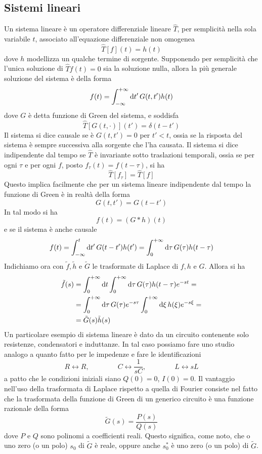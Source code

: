 \documentclass[a4paper, 11pt]{article}
\begin{document}
	\subsection{Sistemi lineari}
	Un sistema lineare è un operatore differenziale lineare $\hat{T}$, per semplicità nella sola variabile $t$, associato all'equazione differenziale non omogenea
	\[\hat{T}[f](t)=h(t)\]
	dove $h$ modellizza un qualche termine di sorgente. Supponendo per semplicità che l'unica soluzione di $\hat{T}f(t)=0$ sia la soluzione nulla, allora la più generale soluzione del sistema è della forma
	\[f(t)=\int_{-\infty}^{+\infty}\mathrm{d} t'\, G(t,t')h(t)\]
	dove $G$ è detta funzione di Green del sistema, e soddisfa
	\[\hat T[G(t,\cdot)](t')=\delta(t-t')\]
	Il sistema si dice causale se è $G(t,t')=0$ per $t'<t$, ossia se la risposta del sistema è sempre successiva alla sorgente che l'ha causata. Il sistema si dice indipendente dal tempo se $\hat T$ è invariante sotto traslazioni temporali, ossia se per ogni $\tau$ e per ogni $f$, posto $f_\tau(t)=f(t-\tau)$, si ha
	\[\hat T[f_\tau]=\hat T[f]\]
	Questo implica facilmente che per un sistema lineare indipendente dal tempo la funzione di Green è in realtà della forma
	\[G(t,t')=G(t-t')\]
	In tal modo si ha
	\[f(t)=(G*h)(t)\]
	e se il sistema è anche causale
	\[f(t)=\int_{-\infty}^{t}\mathrm{d} t'\, G(t-t')h(t')=\int_{0}^{+\infty}\mathrm{d} \tau\, G(\tau)h(t-\tau)\]
	Indichiamo ora con $\tilde{f},\tilde{h}$ e $\tilde{G}$ le trasformate di Laplace di $f,h$ e $G$. Allora si ha
	\begin{align*}
		\tilde{f}(s)&=\int_{0}^{+\infty}\mathrm{d} t\int_{0}^{+\infty}\mathrm{d} \tau\, G(\tau)h(t-\tau)e^{-st}=\\&=\int_{0}^{+\infty}\mathrm{d} \tau\, G(\tau)e^{-s\tau}\int_{0}^{+\infty}\mathrm{d} \xi \,h(\xi)e^{-s\xi}=\\&=\tilde{G}(s)\tilde{h}(s)
	\end{align*}
	Un particolare esempio di sistema lineare è dato da un circuito contenente solo resistenze, condensatori e induttanze. In tal caso possiamo fare uno studio analogo a quanto fatto per le impedenze e fare le identificazioni
	\[R\leftrightarrow R,\qquad\qquad C\leftrightarrow\frac{1}{sC},\qquad\qquad L\leftrightarrow sL\]
	a patto che le condizioni iniziali siano $Q(0)=0$, $I(0)=0$. Il vantaggio nell'uso della trasformata di Laplace rispetto a quella di Fourier consiste nel fatto che la trasformata della funzione di Green di un generico circuito è una funzione razionale della forma
	\[\tilde{G}(s)=\frac{P(s)}{Q(s)}\]
	dove $P$ e $Q$ sono polinomi a coefficienti reali. Questo significa, come noto, che o uno zero (o un polo) $s_0$ di $\tilde{G}$ è reale, oppure anche $s_0^*$ è uno zero (o un polo) di $\tilde{G}$.
	
\end{document}
